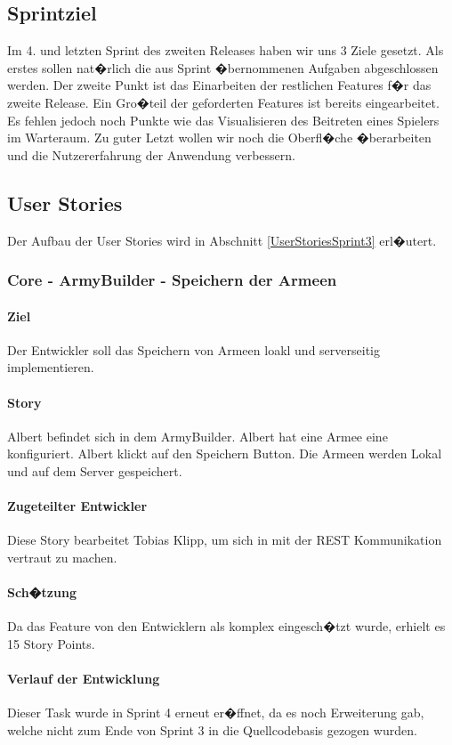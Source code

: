 \documentclass[12pt, titlepage]{scrartcl}
\newcommand{\RN}[1]{%
	\textup{\uppercase\expandafter{\romannumeral#1}}%
}
\begin{document}
		\subsection{Sprintziel}
			Im 4. und letzten Sprint des zweiten Releases haben wir uns 3 Ziele gesetzt. Als erstes sollen nat�rlich die aus Sprint \RN{3} �bernommenen Aufgaben abgeschlossen werden. Der zweite Punkt ist das Einarbeiten der restlichen Features f�r das zweite Release. Ein Gro�teil der geforderten Features ist bereits eingearbeitet. Es fehlen jedoch noch Punkte wie das Visualisieren des Beitreten eines Spielers im Warteraum. Zu guter Letzt wollen wir noch die Oberfl�che �berarbeiten und die Nutzererfahrung der Anwendung verbessern.
		
		\subsection{User Stories}
			Der Aufbau der User Stories wird in Abschnitt \ref{UserStoriesSprint3} erl�utert.
			
			\subsubsection{Core - ArmyBuilder - Speichern der Armeen}
			\paragraph{Ziel} Der Entwickler soll das Speichern von Armeen loakl und serverseitig implementieren.
			\paragraph{Story} Albert befindet sich in dem ArmyBuilder. Albert hat eine Armee eine konfiguriert. Albert klickt auf den Speichern Button. Die Armeen werden Lokal und auf dem Server gespeichert.
			\paragraph{Zugeteilter Entwickler} Diese Story bearbeitet Tobias Klipp, um sich in mit der REST Kommunikation vertraut zu machen.
			\paragraph{Sch�tzung}
			Da das Feature von den Entwicklern als komplex eingesch�tzt wurde, erhielt es 15 Story Points.
			\paragraph{Verlauf der Entwicklung} Dieser Task wurde in Sprint 4 erneut er�ffnet, da es noch Erweiterung gab, welche nicht zum Ende von Sprint 3 in die Quellcodebasis gezogen wurden.
			
\end{document}

